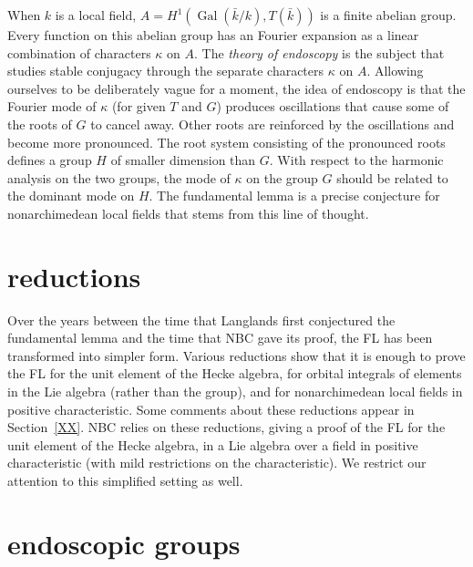 \documentclass[brochure,english,12pt]{bourbaki}
\def\op#1{{\operatorname{#1}}}
\begin{document}
When $k$ is a local field, $A=H^1(\op{Gal}(\bar k/k),T(\bar k))$ is a
finite abelian group.  Every function on this abelian group has an
Fourier expansion as a linear combination of characters $\kappa$ on
$A$.  
The {\it theory of endoscopy}
is the subject that studies stable conjugacy through the separate
characters $\kappa$ on $A$.  Allowing ourselves to be deliberately
vague for a moment, the idea of endoscopy is that the Fourier mode of
$\kappa$ (for given $T$ and $G$) produces oscillations that cause some
of the roots of $G$ to cancel away.  Other roots are
reinforced by the oscillations and become more pronounced.  The root
system consisting of the pronounced roots defines a group $H$ of smaller
dimension than $G$.  With respect to the harmonic analysis on the two
groups, the mode of $\kappa$ on the group $G$ should
be related to the dominant mode on $H$.  The fundamental lemma is a precise
conjecture for nonarchimedean local fields that stems from this line of thought.


\section{reductions}

Over the years between the time that Langlands first conjectured the
fundamental lemma and the time that NBC gave its proof, the FL has
been transformed into simpler form.  Various reductions show that it
is enough to prove the FL for the unit element of the Hecke algebra,
for orbital integrals of elements in the Lie algebra (rather than the
group), and for nonarchimedean local fields in positive
characteristic.  Some comments about these reductions appear in
Section~\ref{XX}.  NBC relies on these reductions, giving a proof of
the FL for the unit element of the Hecke algebra, in a Lie algebra
over a field in positive characteristic (with mild restrictions on the
characteristic).  We restrict our attention to this simplified setting as well.


\section{endoscopic groups}
\end{document}
